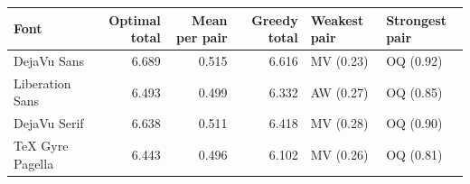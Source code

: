 \begin{tabular}{lrrrll}
\toprule
Font & Optimal total & Mean per pair & Greedy total & Weakest pair & Strongest pair\\
\midrule
DejaVu Sans & 6.689 & 0.515 & 6.616 & MV (0.23) & OQ (0.92)\\
Liberation Sans & 6.493 & 0.499 & 6.332 & AW (0.27) & OQ (0.85)\\
DejaVu Serif & 6.638 & 0.511 & 6.418 & MV (0.28) & OQ (0.90)\\
TeX Gyre Pagella & 6.443 & 0.496 & 6.102 & MV (0.26) & OQ (0.81)\\
\bottomrule
\end{tabular}

